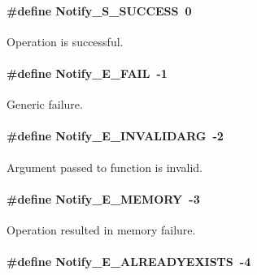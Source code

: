 \paragraph[{Notify\_\-S\_\-SUCCESS}]{\setlength{\rightskip}{0pt plus 5cm}\#define Notify\_\-S\_\-SUCCESS~0}\hfill\label{_notify_8h_a846ddddd026310bcbcda9837a3571ba4}


Operation is successful. 

\paragraph[{Notify\_\-E\_\-FAIL}]{\setlength{\rightskip}{0pt plus 5cm}\#define Notify\_\-E\_\-FAIL~-\/1}\hfill\label{_notify_8h_a20a2a59166c514c653d7eed49344566e}


Generic failure. 

\paragraph[{Notify\_\-E\_\-INVALIDARG}]{\setlength{\rightskip}{0pt plus 5cm}\#define Notify\_\-E\_\-INVALIDARG~-\/2}\hfill\label{_notify_8h_a31fc3f7c99af3b98e9fd9f666cc4e2f3}


Argument passed to function is invalid. 

\paragraph[{Notify\_\-E\_\-MEMORY}]{\setlength{\rightskip}{0pt plus 5cm}\#define Notify\_\-E\_\-MEMORY~-\/3}\hfill\label{_notify_8h_aa74af2d630f14ab3083a587ef0337184}


Operation resulted in memory failure. 

\paragraph[{Notify\_\-E\_\-ALREADYEXISTS}]{\setlength{\rightskip}{0pt plus 5cm}\#define Notify\_\-E\_\-ALREADYEXISTS~-\/4}\hfill\label{_notify_8h_aea5c89c302ce37850d8819c85e29ce97}


